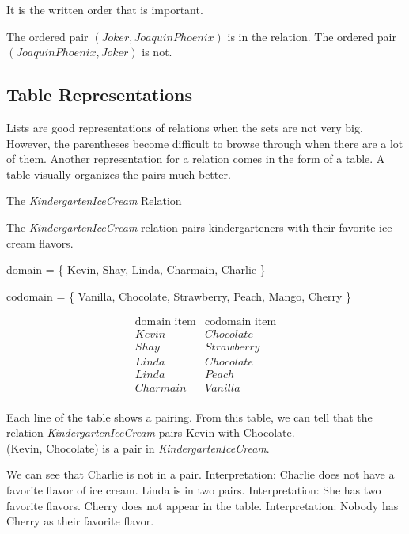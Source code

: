 \documentclass{ximera}
\begin{document}
It is the written order that is important. 

The ordered pair $(Joker, Joaquin Phoenix)$ is in the relation.  The ordered pair $(Joaquin Phoenix, Joker)$ is not. 













\subsection*{Table Representations}



Lists are good representations of relations when the sets are not very big. However, the parentheses become difficult to browse through when there are a lot of them. Another representation for a relation comes in the form of a table. A table visually organizes the pairs much better.

\begin{example} The \textit{KindergartenIceCream} Relation


The \textit{KindergartenIceCream} relation pairs kindergarteners with their favorite ice cream flavors.

domain = \{ Kevin, Shay, Linda, Charmain, Charlie \}  

codomain = \{ Vanilla, Chocolate, Strawberry, Peach, Mango, Cherry \} 

\[
\begin{array}{l|l}
    \text{domain item}      & \text{codomain item}      \\ \hline
    Kevin   &  Chocolate \\
    Shay   & Strawberry \\
    Linda  &  Chocolate \\
    Linda  &  Peach \\
    Charmain &  Vanilla \\ 
\end{array}
\]


Each line of the table shows a pairing. From this table, we can tell that the relation \textit{KindergartenIceCream} pairs Kevin with Chocolate.  \\(Kevin, Chocolate) is a pair in \textit{KindergartenIceCream}.

We can see that Charlie is not in a pair.  Interpretation: Charlie does not have a favorite flavor of ice cream. Linda is in two pairs.  Interpretation: She has two favorite flavors.  Cherry does not appear in the table. Interpretation: Nobody has Cherry as their favorite flavor.

\end{example} 
\end{document}
